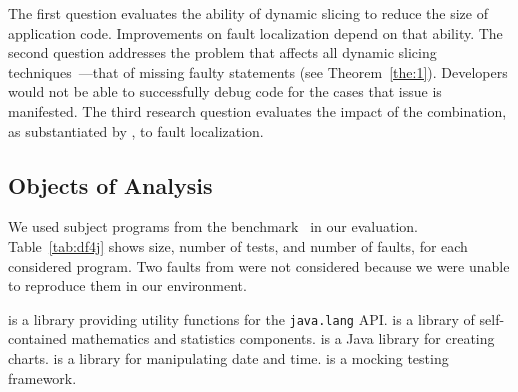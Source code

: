 \documentclass{article}
\begin{document}
The first question evaluates the ability of dynamic slicing to reduce
the size of application code. Improvements on fault localization
depend on that ability. The second question addresses the problem that
affects all dynamic slicing
techniques~\cite{Lin:2018:BDE:3238147.3238163}---that of missing
faulty statements (see Theorem~\ref{the:1}). Developers would
not be able to successfully debug code for the cases that issue is
manifested. The third research question evaluates the impact of the
combination, as substantiated by \comb, to fault localization.


%
%
\subsection{Objects of Analysis}\label{sec:analysis}


We used subject programs from the \dfj{}
benchmark~\cite{just-defects4j-issta2014} in our evaluation.
Table~\ref{tab:df4j} shows size, number of tests, and number of
faults, for each considered program. Two faults from \cmath{} were not
considered because we were unable to reproduce them in our
environment.

\lang{} is a library providing utility functions for the
     {\small\texttt{java.lang}} API. \cmath{} is a library of
     self-contained mathematics and statistics components. \chart{} is a Java library for creating charts.
     \jtime{} is a library for manipulating date and time. \mockito{} is a mocking
     testing framework.
\end{document}
